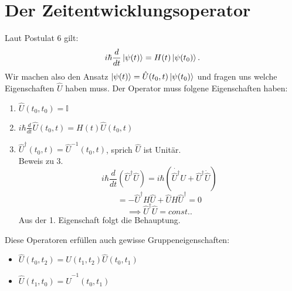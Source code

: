\documentclass{report}
\begin{document}
\section{Der Zeitentwicklungsoperator}
Laut Postulat 6 gilt: \[
	i \hbar \frac{d}{dt} \ket{\psi(t)} = H(t) \ket{\psi(t_0)}  
.\] Wir machen also den Ansatz $\ket{\psi(t)} = \hat{U}(t_0, t) \ket{\psi(t_0)} $ und fragen uns welche Eigenschaften $\hat{U}$ haben muss. Der Operator muss folgene Eigenschaften haben:
\begin{enumerate}
	\item $\hat{U}(t_0, t_0) = \mathbb{I}$ \\
	\item $i \hbar \frac{d}{dt} \hat{U}(t_0, t) = H(t) \hat{U}(t_0, t)$ \\
	\item $\hat{U}^\dagger(t_0, t) = \hat{U}^{-1}(t_0, t)$, sprich $\hat{U}$ ist Unitär. \\
		Beweis zu 3.  \[
			i \hbar \frac{d}{dt} (\hat{U}^\dagger\hat{U}) = i \hbar (\dot{\hat{U}^\dagger}U + \hat{U}^\dagger\dot{\hat{U}})
		\] \[
		= -\hat{U}^\dagger H \hat{U} + \hat{U} H \hat{U}^\dagger = 0
	\] \[
	\implies \hat{U}^\dagger\hat{U} = const.
	.\]   Aus der 1. Eigenschaft folgt die Behauptung.
\end{enumerate}
Diese Operatoren erfüllen auch gewisse Gruppeneigenschaften: 
\begin{itemize}
	\item $\hat{U}(t_0, t_2) = \hat{U}(t_1, t_2)\hat{U}(t_0, t_1)$ \\
	\item $\hat{U}(t_1, t_0) = \hat{U}^{-1}(t_0, t_1)$
\end{itemize}
\end{document}

